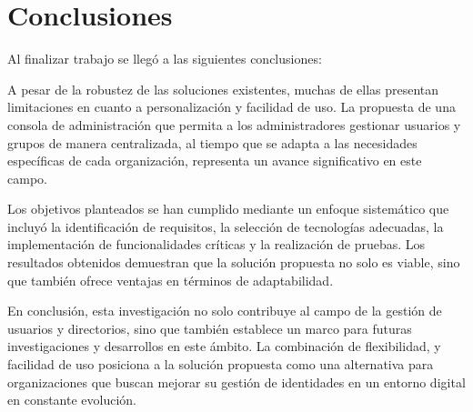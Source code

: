 \section*{Conclusiones}

Al finalizar trabajo se llegó a las siguientes conclusiones:

A pesar de la robustez de las soluciones existentes, muchas de ellas presentan limitaciones en cuanto a personalización y facilidad de uso. La propuesta de una consola de administración que permita a los administradores gestionar usuarios y grupos de manera centralizada, al tiempo que se adapta a las necesidades específicas de cada organización, representa un avance significativo en este campo.

Los objetivos planteados se han cumplido mediante un enfoque sistemático que incluyó la identificación de requisitos, la selección de tecnologías adecuadas, la implementación de funcionalidades críticas y la realización de pruebas. Los resultados obtenidos demuestran que la solución propuesta no solo es viable, sino que también ofrece ventajas en términos de adaptabilidad.

En conclusión, esta investigación no solo contribuye al campo de la gestión de usuarios y directorios, sino que también establece un marco para futuras investigaciones y desarrollos en este ámbito. La combinación de flexibilidad, y facilidad de uso posiciona a la solución propuesta como una alternativa para organizaciones que buscan mejorar su gestión de identidades en un entorno digital en constante evolución.
